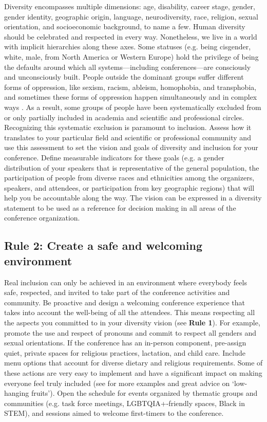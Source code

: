 \documentclass[10pt,letterpaper]{article}
\begin{document}
Diversity encompasses multiple dimensions: age, disability, career stage, gender, gender identity, geographic origin, language, neurodiversity, race, religion, sexual orientation, and socioeconomic background, to name a few.
Human diversity should be celebrated and respected in every way. 
Nonetheless, we live in a world with implicit hierarchies along these axes. 
Some statuses (e.g. being cisgender, white, male, from North America or Western Europe) hold the privilege of being the defaults around which all systems—including conferences—are consciously and unconsciously built. 
People outside the dominant groups suffer different forms of oppression, like sexism, racism, ableism, homophobia, and transphobia, and sometimes these forms of oppression happen simultaneously and in complex ways \cite{crenshawDemarginalizingIntersectionRace1989}.
As a result, some groups of people have been systematically excluded from or only partially included in academia and scientific and professional circles.
Recognizing this systematic exclusion is paramount to inclusion.
Assess how it translates to your particular field and scientific or professional community and use this assessment to set the vision and goals of diversity and inclusion for your conference.
Define measurable indicators for these goals (e.g. a gender distribution of your speakers that is representative of the general population, the participation of people from diverse races and ethnicities among the organizers, speakers, and attendees, or participation from key geographic regions) that will help you be accountable along the way.
The vision can be expressed in a diversity statement to be used as a reference for decision making in all areas of the conference organization. 

\subsection*{Rule 2: Create a safe and welcoming environment}
\label{rule_inclusion}

Real inclusion can only be achieved in an environment where everybody feels safe, respected, and invited to take part of the conference activities and community. Be proactive and design a welcoming conference experience that takes into account the well-being of all the attendees. This means respecting all the aspects you committed to in your diversity vision (see \textbf{Rule 1}). For example, promote the use and respect of pronouns and commit to respect all genders and sexual orientations. If the conference has an in-person component, pre-assign quiet, private spaces for religious practices, lactation, and child care. Include menu options that account for diverse dietary and religious requirements.
Some of these actions are very easy to implement and have a significant impact on making everyone feel truly included (see \cite{numfocus_discover_2021} for more examples and  great advice on `low-hanging fruits').
Open the schedule for events organized by thematic groups and communities (e.g. task force meetings, LGBTQIA+-friendly spaces, Black in STEM), and sessions aimed to welcome first-timers to the conference.
\end{document}
